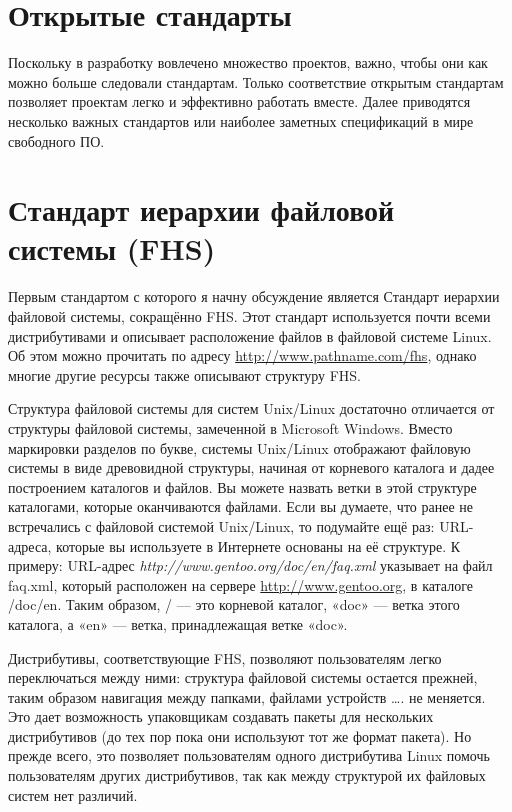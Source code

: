 \documentclass[10pt]{book}
\begin{document}
\section{Открытые стандарты}

Поскольку в разработку вовлечено множество проектов, важно, чтобы они как можно больше следовали стандартам. Только соответствие открытым стандартам позволяет проектам легко и эффективно работать вместе. Далее приводятся несколько важных стандартов или наиболее заметных спецификаций в мире свободного ПО.

\section{Стандарт иерархии файловой системы (FHS)}

Первым стандартом с которого я начну обсуждение является Стандарт иерархии файловой системы, сокращённо FHS. Этот стандарт используется почти всеми дистрибутивами и описывает расположение файлов в файловой системе Linux. Об этом можно прочитать по адресу \href{http://www.pathname.com/fhs/}{http://www.pathname.com/fhs}, однако многие другие ресурсы также описывают структуру FHS.

Структура файловой системы для систем Unix/Linux достаточно отличается от структуры файловой системы, замеченной в Microsoft Windows. Вместо маркировки разделов по букве, системы  Unix/Linux отображают файловую системы в виде древовидной структуры, начиная от корневого каталога и  дадее построением каталогов и файлов. Вы можете назвать ветки в этой структуре каталогами, которые оканчиваются файлами. Если вы думаете, что ранее не встречались с файловой системой Unix/Linux, то подумайте ещё раз: URL-адреса, которые вы используете в Интернете основаны на её структуре. К примеру: URL-адрес \emph{http://www.gentoo.org/\break{}doc/en/faq.xml} указывает на файл faq.xml, который расположен на сервере \href{www.gentoo.org}{http://\break{}www.gentoo.org}, в каталоге /doc/en. Таким образом, / --- это корневой каталог, «doc» --- ветка этого каталога, а «en» --- ветка, принадлежащая ветке «doc».

Дистрибутивы, соответствующие FHS, позволяют пользователям легко переключаться между ними: структура файловой системы остается прежней, таким образом навигация между папками, файлами устройств …. не меняется. Это дает возможность упаковщикам создавать пакеты для нескольких дистрибутивов (до тех пор пока они используют тот же формат пакета). Но прежде всего, это позволяет пользователям одного дистрибутива Linux помочь пользователям других дистрибутивов, так как между структурой их файловых систем нет различий.
\end{document}
